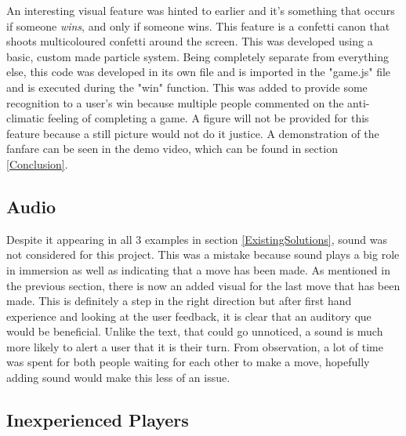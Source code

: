An interesting visual feature was hinted to earlier and it's something that occurs if someone \emph{wins}, and only if someone wins. This feature is a confetti canon that shoots multicoloured confetti around the screen. This was developed using a basic, custom made particle system. Being completely separate from everything else, this code was developed in its own file and is imported in the "game.js" file and is executed during the "win" function. This was added to provide some recognition to a user's win because multiple people commented on the anti-climatic feeling of completing a game. A figure will not be provided for this feature because a still picture would not do it justice. A demonstration of the fanfare can be seen in the demo video, which can be found in section \ref{Conclusion}.

\subsection{Audio}

Despite it appearing in all 3 examples in section \ref{ExistingSolutions}, sound was not considered for this project. This was a mistake because sound plays a big role in immersion as well as indicating that a move has been made. As mentioned in the previous section, there is now an added visual for the last move that has been made. This is definitely a step in the right direction but after first hand experience and looking at the user feedback, it is clear that an auditory que would be beneficial. Unlike the text, that could go unnoticed, a sound is much more likely to alert a user that it is their turn. From observation, a lot of time was spent for both people waiting for each other to make a move, hopefully adding sound would make this less of an issue.

\subsection{Inexperienced Players}

